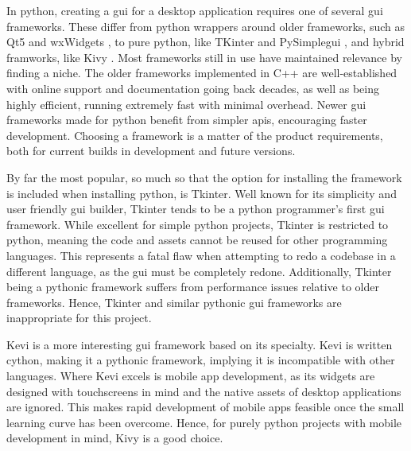 \documentclass[11pt]{article}
\begin{document}
In \Gls{python}, creating a \acrshort{gui} for a desktop application requires one of several \acrshort{gui} \glspl{framework}. These differ from \Gls{python} wrappers around older \glspl{framework}, such as Qt5 and wxWidgets \cite{qt} \cite{wxwidgets}, to pure python, like TKinter and PySimple\acrshort{gui} \cite{tkinter} \cite{pysimplegui}, and hybrid framworks, like Kivy \cite{kivy}. Most \glspl{framework} still in use have maintained relevance by finding a niche. The older \glspl{framework} implemented in C++ are well-established with online support and documentation going back decades, as well as being highly efficient, running extremely fast with minimal overhead. Newer \acrshort{gui} \glspl{framework} made for \Gls{python} benefit from simpler \acrshort{api}s, encouraging faster development. Choosing a \gls{framework} is a matter of the product requirements, both for current builds in development and future versions.

By far the most popular, so much so that the option for installing the \gls{framework} is included when installing \Gls{python}, is Tkinter. Well known for its simplicity and \gls{user} friendly \acrshort{gui} builder, Tkinter tends to be a \Gls{python} programmer's first \acrshort{gui} \gls{framework}. While excellent for simple \Gls{python} projects, Tkinter is restricted to \Gls{python}, meaning the code and assets cannot be reused for other programming languages. This represents a fatal flaw when attempting to redo a codebase in a different language, as the \acrshort{gui} must be completely redone. Additionally, Tkinter being a \Gls{python}ic \gls{framework} suffers from performance issues relative to older \glspl{framework}. Hence, Tkinter and similar \Gls{python}ic \acrshort{gui} \glspl{framework} are inappropriate for this project.

Kevi is a more interesting \acrshort{gui} \gls{framework} based on its specialty. Kevi is written \Gls{cython}, making it a \Gls{python}ic \gls{framework}, implying it is incompatible with other languages. Where Kevi excels is mobile app development, as its widgets are designed with touchscreens in mind and the native assets of desktop applications are ignored. This makes rapid development of mobile apps feasible once the small learning curve has been overcome. Hence, for purely \Gls{python} projects with mobile development in mind, Kivy is a good choice.
\end{document}
